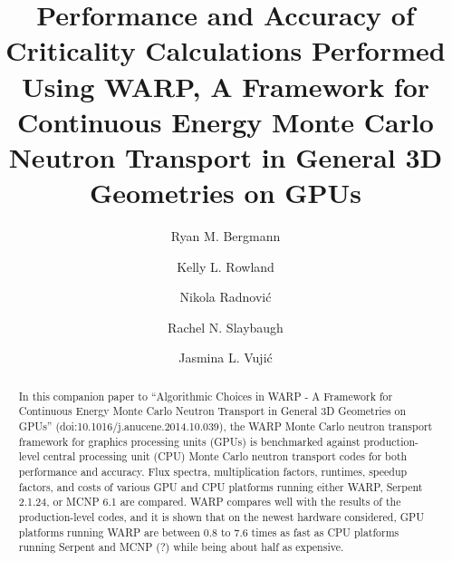 \documentclass[preprint,12pt]{elsarticle}
\begin{document}
\begin{frontmatter}



\title{Performance and Accuracy of Criticality Calculations Performed Using WARP, A Framework for Continuous Energy Monte Carlo Neutron Transport in General 3D Geometries on GPUs}


\author{Ryan M. Bergmann}

\author{Kelly L. Rowland}

\author{Nikola Radnovi\'c}

\author{Rachel N. Slaybaugh}

\author{Jasmina L. Vuji\'c}


\address{Department of Nuclear Engineering, 
4155 Etcheverry Hall, 
University of California - Berkeley,
Berkeley, CA 94720-1730}

\begin{abstract}

In this companion paper to ``Algorithmic Choices in WARP - A Framework for Continuous Energy Monte Carlo Neutron Transport in General 3D Geometries on GPUs'' (doi:10.1016/j.anucene.2014.10.039), the WARP Monte Carlo neutron transport framework for graphics processing units (GPUs) is benchmarked against production-level central processing unit (CPU) Monte Carlo neutron transport codes for both performance and accuracy.  Flux spectra, multiplication factors, runtimes, speedup factors, and costs of various GPU and CPU platforms running either WARP, Serpent 2.1.24, or MCNP 6.1 are compared.  WARP compares well with the results of the production-level codes, and it is shown that on the newest hardware considered, GPU platforms running WARP are between 0.8 to 7.6 times as fast as CPU platforms running Serpent and MCNP (?) while being about half as expensive.  


\end{abstract}
\end{frontmatter}
\end{document}

